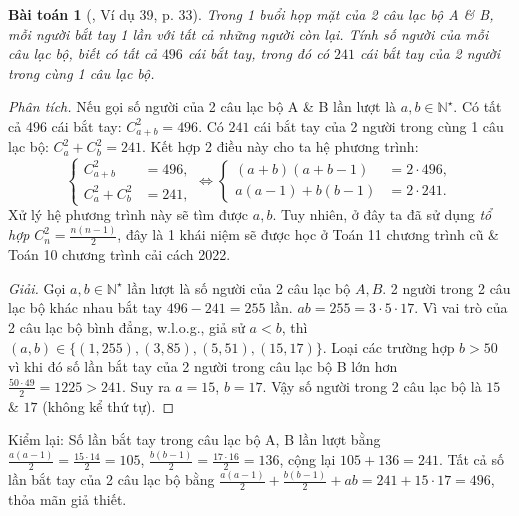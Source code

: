 \documentclass{article}
\numberwithin{equation}{section}
\newtheorem{baitoan}{Bài toán}[section]
\begin{document}
\begin{baitoan}[\cite{Binh_Toan_6_tap_1}, Ví dụ 39, p. 33]
	Trong 1 buổi họp mặt của 2 câu lạc bộ A \& B, mỗi người bắt tay 1 lần với tất cả những người còn lại. Tính số người của mỗi câu lạc bộ, biết có tất cả $496$ cái bắt tay, trong đó có $241$ cái bắt tay của 2 người trong cùng 1 câu lạc bộ.
\end{baitoan}
\noindent\textit{Phân tích.} Nếu gọi số người của 2 câu lạc bộ A \& B lần lượt là $a,b\in\mathbb{N}^\star$. Có tất cả $496$ cái bắt tay: $C_{a+b}^2 = 496$. Có $241$ cái bắt tay của 2 người trong cùng 1 câu lạc bộ: $C_a^2 + C_b^2 = 241$. Kết hợp 2 điều này cho ta hệ phương trình:
\begin{equation*}
	\left\{\begin{split}
		C_{a+b}^2 &= 496,\\
		C_a^2 + C_b^2 &= 241,
	\end{split}\right.\Leftrightarrow\left\{\begin{split}
		(a + b)(a + b - 1) &= 2\cdot 496,\\
		a(a - 1) + b(b - 1) &= 2\cdot 241.
	\end{split}\right.
\end{equation*}
Xử lý hệ phương trình này sẽ tìm được $a,b$. Tuy nhiên, ở đây ta đã sử dụng \textit{tổ hợp} $C_n^2 = \frac{n(n - 1)}{2}$, đây là 1 khái niệm sẽ được học ở Toán 11 chương trình cũ \& Toán 10 chương trình cải cách 2022.

\begin{proof}[Giải]
	Gọi $a,b\in\mathbb{N}^\star$ lần lượt là số người của 2 câu lạc bộ $A,B$. 2 người trong 2 câu lạc bộ khác nhau bắt tay $496 - 241 = 255$ lần. $ab = 255 = 3\cdot 5\cdot 17$. Vì vai trò của 2 câu lạc bộ bình đẳng, w.l.o.g., giả sử $a < b$, thì $(a,b)\in\{(1,255),(3,85),(5,51),(15,17)\}$. Loại các trường hợp $b > 50$ vì khi đó số lần bắt tay của 2 người trong câu lạc bộ B lớn hơn $\frac{50\cdot 49}{2} = 1225 > 241$. Suy ra $a = 15$, $b = 17$. Vậy số người trong 2 câu lạc bộ là $15$ \& $17$ (không kể thứ tự).
\end{proof}
Kiểm lại: Số lần bắt tay trong câu lạc bộ A, B lần lượt bằng $\frac{a(a - 1)}{2} = \frac{15\cdot 14}{2} = 105$, $\frac{b(b - 1)}{2} = \frac{17\cdot 16}{2} = 136$, cộng lại $105 + 136 = 241$. Tất cả số lần bắt tay của 2 câu lạc bộ bằng $\frac{a(a - 1)}{2} + \frac{b(b - 1)}{2} + ab = 241 + 15\cdot 17 = 496$, thỏa mãn giả thiết.
\end{document}
